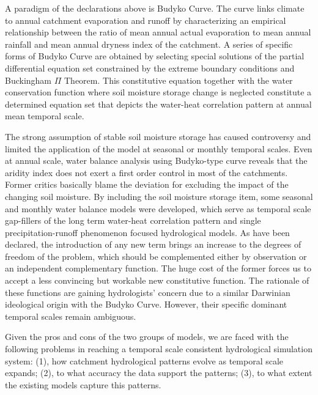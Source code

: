 \documentclass[11pt]{article}
\begin{document}
A paradigm of the declarations above is Budyko Curve\cite{budyko1961heat}. The curve links climate to annual catchment evaporation and runoff by characterizing an empirical relationship between the ratio of mean annual actual evaporation to mean annual rainfall and mean annual dryness index of the catchment\cite{wang2012responses}. A series of specific forms of Budyko Curve are obtained by selecting special solutions of the partial differential equation set constrained  by the extreme boundary conditions and Buckingham $\Pi$ Theorem\cite{FuBaopu,choudhury1999evaluation,yang2008new}. This constitutive equation together with the water conservation function where soil moisture storage change is neglected constitute a determined equation set that depicts the water-heat correlation pattern at annual mean temporal scale\cite{zhang2001response,yang2007analyzing}. 

The strong assumption of stable soil moisture storage has caused controversy and limited the application of the model at seasonal or monthly temporal scales. Even at annual scale, water balance analysis using Budyko-type curve reveals that the aridity index does not exert a first order control in most of the catchments\cite{tekleab2011water}. Former critics basically blame the deviation for excluding the impact of the changing soil moisture\cite{sankarasubramanian2002annual,sankarasubramanian2003hydroclimatology}. By including the soil moisture storage item, some seasonal and monthly water balance models were developed\cite{abcd,xiong1999two,zhang2008water}, which serve as  temporal scale gap-fillers of the long term water-heat correlation pattern and single precipitation-runoff phenomenon focused hydrological models. As have been declared, the introduction of any new term brings an increase to the degrees of freedom of the problem, which should be complemented either by observation or an independent complementary function. The huge cost of the former forces us to accept a less convincing but workable new constitutive function. The rationale of these functions are gaining hydrologists' concern due to a similar Darwinian ideological origin with the Budyko Curve\cite{wang2014one}. However, their specific dominant temporal scales remain ambiguous. 

Given the pros and cons of the two groups of models, we are faced with the following problems in reaching a temporal scale consistent hydrological simulation system: (1), how catchment hydrological patterns evolve as temporal scale expands; (2), to what accuracy the data support the patterns; (3), to what extent the existing models capture this patterns.
\end{document}
